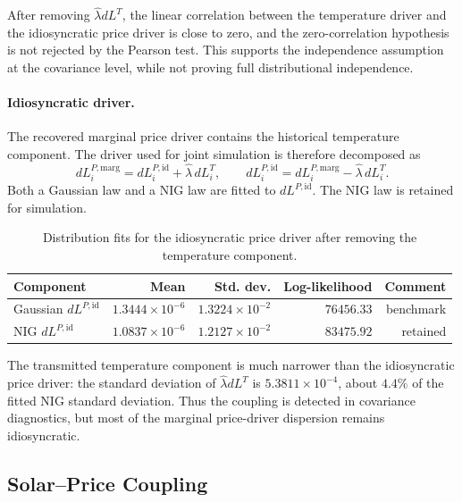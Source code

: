 After removing \(\widehat\lambda dL^T\), the linear correlation between the
temperature driver and the idiosyncratic price driver is close to zero, and the
zero-correlation hypothesis is not rejected by the Pearson test. This supports
the independence assumption at the covariance level, while not proving full
distributional independence.

\paragraph{Idiosyncratic driver.}
The recovered marginal price driver contains the historical temperature
component. The driver used for joint simulation is therefore decomposed as
\begin{equation}
  dL_i^{P,\mathrm{marg}}
  =
  dL_i^{P,\mathrm{id}}
  +
  \widehat\lambda\,dL_i^T,
  \qquad
  dL_i^{P,\mathrm{id}}
  =
  dL_i^{P,\mathrm{marg}}
  -
  \widehat\lambda\,dL_i^T .
  \label{eq:temperature-coupling-driver-decomposition}
\end{equation}
Both a Gaussian law and a NIG law are fitted to
\(dL^{P,\mathrm{id}}\). The NIG law is retained for simulation.

\begin{table}[H]
  \centering
  \caption{Distribution fits for the idiosyncratic price driver after removing
  the temperature component.}
  \label{tab:temperature-price-idio-driver-fit}
  \begin{tabular}{@{}lrrrr@{}}
    \toprule
    Component & Mean & Std. dev. & Log-likelihood & Comment \\
    \midrule
    Gaussian \(dL^{P,\mathrm{id}}\)
    & \(1.3444{\times}10^{-6}\) & \(1.3224{\times}10^{-2}\)
    & \(76456.33\) & benchmark \\
    NIG \(dL^{P,\mathrm{id}}\)
    & \(1.0837{\times}10^{-6}\) & \(1.2127{\times}10^{-2}\)
    & \(83475.92\) & retained \\
    \bottomrule
  \end{tabular}
\end{table}

The transmitted temperature component is much narrower than the idiosyncratic
price driver: the standard deviation of \(\widehat\lambda dL^T\) is
\(5.3811{\times}10^{-4}\), about \(4.4\%\) of the fitted NIG standard
deviation. Thus the coupling is detected in covariance diagnostics, but most of
the marginal price-driver dispersion remains idiosyncratic.

\subsection{Solar--Price Coupling}\label{ssec:solar-price-coupling}

